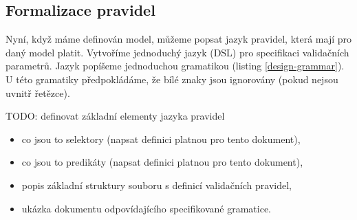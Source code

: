 
\subsection{Formalizace pravidel}

Nyní, když máme definován model, můžeme popsat jazyk pravidel, která mají pro daný model platit. Vytvoříme jednoduchý jazyk (DSL) pro specifikaci validačních parametrů. Jazyk popíšeme jednoduchou gramatikou (listing \ref{design-grammar}). U této gramatiky předpokládáme, že bílé znaky jsou ignorovány (pokud nejsou uvnitř řetězce).

TODO: definovat základní elementy jazyka pravidel

\begin{itemize}
\item co jsou to selektory (napsat definici platnou pro tento dokument),
\item co jsou to predikáty (napsat definici platnou pro tento dokument),
\item popis základní struktury souboru s definicí validačních pravidel,
\item ukázka dokumentu odpovídajícího specifikované gramatice.
\end{itemize}

